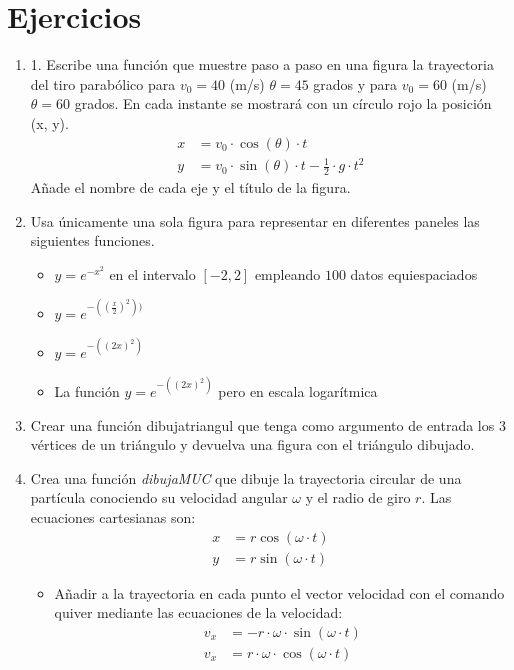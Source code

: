 \section{Ejercicios}
\begin{enumerate}
    \item 1. Escribe una función que muestre paso a paso en una figura la trayectoria del tiro parabólico para $v_0=40$ (m/s) $\theta=45 $ grados  y para $v_0=60$ (m/s) $\theta=60 $ grados. En cada instante se mostrará con un círculo rojo la posición (x, y). 
\begin{align*}
    x&=v_0 \cdot \cos(\theta) \cdot t \\
    y&=v_0 \cdot \sin(\theta) \cdot t -\frac{1}{2}\cdot g \cdot t^2
\end{align*}
Añade el nombre de cada eje y el título de la figura.

\item Usa únicamente una sola figura para representar en diferentes paneles las siguientes funciones. 
\begin{itemize}
    \item $y=e^{-x^2}$ en el intervalo $[-2,2]$ empleando $100$ datos equiespaciados
    \item $y=e^{-((\frac{x}{2})^2))}$
    \item $y=e^{-((2x)^2)}$
    \item La función $y=e^{-((2x)^2)}$ pero en escala logarítmica
\end{itemize}

\item Crear una función dibujatriangul que tenga como argumento de entrada los 3 vértices de un triángulo y devuelva una figura con el triángulo dibujado.
\item Crea una función \emph{dibujaMUC} que dibuje la trayectoria circular de una partícula conociendo su velocidad angular $\omega$ y el radio de giro $r$. 
Las ecuaciones cartesianas son:
\begin{align*}
    x&=r\cos(\omega \cdot t)\\
    y&=r\sin (\omega \cdot t)
\end{align*}
\begin{itemize}
    \item Añadir a la trayectoria en cada punto el vector velocidad con el comando quiver mediante las ecuaciones de la velocidad:
    \begin{align*}
        v_x&=-r\cdot \omega \cdot \sin(\omega \cdot t)\\
        v_x&=r\cdot \omega \cdot \cos(\omega \cdot t)
    \end{align*}
\end{itemize}


\end{enumerate}
